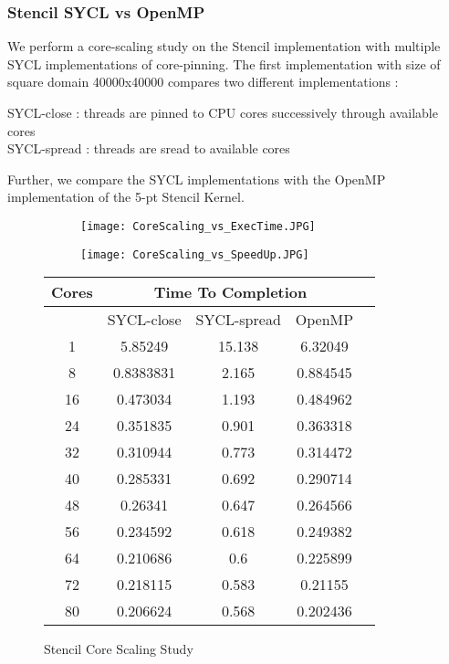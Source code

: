 \documentclass[14pt,fleqn]{article}
\begin{document}
\subsubsection{Stencil SYCL vs OpenMP}
We perform a core-scaling study on the Stencil implementation with multiple SYCL implementations of core-pinning. The first implementation with size of square domain 40000x40000 compares two different implementations :

SYCL-close : threads are pinned to CPU cores successively through available cores \\
SYCL-spread : threads are sread to available cores

Further, we compare the SYCL implementations with the OpenMP implementation of the 5-pt Stencil Kernel.

\begin{figure}
\begin{subfigure}{.5\textwidth}
    \texttt{[image: CoreScaling\_vs\_ExecTime.JPG]}
\end{subfigure}%
\begin{subfigure}{.5\textwidth}
    \texttt{[image: CoreScaling\_vs\_SpeedUp.JPG]}
\end{subfigure}%
\begin{center}
\begin{tabular}{|c|c|c|c|c|}                                   
    \hline\hline  
    Cores & \multicolumn{3}{|c|}{Time To Completion} \\
    \hline\hline
    & SYCL-close & SYCL-spread & OpenMP \\
    \hline\hline
    1 & 5.85249 & 15.138 & 6.32049 \\ \hline
    8 & 0.8383831 & 2.165 & 0.884545\\ \hline
    16 & 0.473034 & 1.193 & 0.484962\\ \hline
    24 & 0.351835 & 0.901 & 0.363318 \\ \hline
    32 & 0.310944 & 0.773 & 0.314472 \\ \hline
    40 & 0.285331 & 0.692 & 0.290714 \\ \hline
    48 & 0.26341 & 0.647 & 0.264566 \\ \hline
    56 & 0.234592 & 0.618 & 0.249382 \\ \hline
    64 & 0.210686 & 0.6 & 0.225899 \\ \hline
    72 & 0.218115 & 0.583 & 0.21155 \\ \hline
    80 & 0.206624 & 0.568 & 0.202436 \\ \hline

\end{tabular}
\end{center}
    \caption{Stencil Core Scaling Study}
\end{figure}
\end{document}
